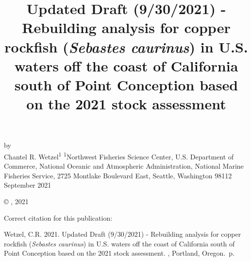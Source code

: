 \documentclass[11pt,
  english,
  a4paper,
]{article}
\date{}
\newcommand{\trTitle}{Updated Draft (9/30/2021) - Rebuilding analysis for copper rockfish (\emph{Sebastes caurinus}) in U.S. waters off the coast of California south of Point Conception based on the 2021 stock assessment}
\newcommand{\trYear}{2021}
\newcommand{\trMonth}{September}
\newcommand{\trAuthsBack}{Wetzel, C.R}
\newcommand{\trCitation}{
\begin{hangparas}{1em}{1}
\trAuthsBack{}. \trYear{}. \trTitle{}. \glsentrylong{pfmc}, Portland, Oregon. \pageref{LastPage}{}\,p.
\end{hangparas}}
\begin{document}

\renewcommand*{\thefootnote}{\fnsymbol{footnote}}

\small
\thispagestyle{empty}
\noindent
\begin{center}
\title{Updated Draft (9/30/2021) - Rebuilding analysis for copper rockfish (\emph{Sebastes caurinus}) in U.S. waters off the coast of California south of Point Conception based on the 2021 stock assessment}
\vspace{1.5cm}
{\Large\textbf{}}
\vfill
by\\
Chantel R. Wetzel\textsuperscript{1}\vfill
\textsuperscript{1}Northwest Fisheries Science Center, U.S. Department of Commerce, National Oceanic and Atmospheric Administration, National Marine Fisheries Service, 2725 Montlake Boulevard East, Seattle, Washington 98112\vfill
\trMonth{} \trYear{}
\end{center}
\clearpage

\thispagestyle{empty}
\vspace*{\fill}
\begin{center}
\copyright{} , \trYear{}\\
\end{center}
\par
\bigskip
\noindent
Correct citation for this publication:
\bigskip
\par
\trCitation{}
\clearpage


\tableofcontents\clearpage
\label{TRlastRoman}
\clearpage

\newpage
\thispagestyle{empty} %

\pagestyle{plain}  %
\renewcommand*{\thefootnote}{\arabic{footnote}}  %
\setcounter{footnote}{0}  %
\renewcommand{\headrulewidth}{0.5pt}
\renewcommand{\footrulewidth}{0.5pt}
\end{document}
